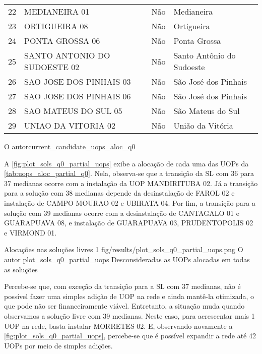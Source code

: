 {\begin{tabular}{l|l|l|l}
    22 &                MEDIANEIRA 01 &   Não &                Medianeira \\
    23 &                ORTIGUEIRA 08 &   Não &                Ortigueira \\
    24 &              PONTA GROSSA 06 &   Não &              Ponta Grossa \\
    25 & SANTO ANTONIO DO SUDOESTE 02 &   Não & Santo Antônio do Sudoeste \\
    26 &      SAO JOSE DOS PINHAIS 03 &   Não &      São José dos Pinhais \\
    27 &      SAO JOSE DOS PINHAIS 06 &   Não &      São José dos Pinhais \\
    28 &         SAO MATEUS DO SUL 05 &   Não &         São Mateus do Sul \\
    29 &          UNIAO DA VITORIA 02 &   Não &          União da Vitória \\
 \hline
\end{tabular}}
{O autor}{current_candidate_uops_aloc_q0}{}{}

A \autoref{fig:plot_sols_q0_partial_uops} exibe a alocação de cada uma das UOPs da \autoref{tab:uops_aloc_partial_q0}. Nela, observa-se que a transição da SL com 36 para 37 medianas ocorre com a instalação da UOP MANDIRITUBA 02. Já a transição para a solução com 38 medianas depende da desinstalação de FAROL 02 e instalação de CAMPO MOURAO 02 e UBIRATA 04. Por fim, a transição para a solução com 39 medianas ocorre com a desinstalação de CANTAGALO 01 e GUARAPUAVA 08, e instalação de GUARAPUAVA 03, PRUDENTOPOLIS 02 e VIRMOND 01. 

\figurah
{Alocações nas soluções livres}
{1}
{fig/results/plot_sols_q0_partial_uops.png}
{O autor}
{plot_sols_q0_partial_uops}
{Desconsideradas as UOPs alocadas em todas as soluções}
{}

Percebe-se que, com exceção da transição para a SL com 37 medianas, não é possível fazer uma simples adição de UOP na rede e ainda mantê-la otimizada, o que pode não ser financeiramente viável. Entretanto, a situação muda quando observamos a solução livre com 39 medianas. Neste caso, para acrescentar mais 1 UOP na rede, basta instalar MORRETES 02. E, observando novamente a \autoref{fig:plot_sols_q0_partial_uops}, percebe-se que é possível expandir a rede até 42 UOPs por meio de simples adições. 

